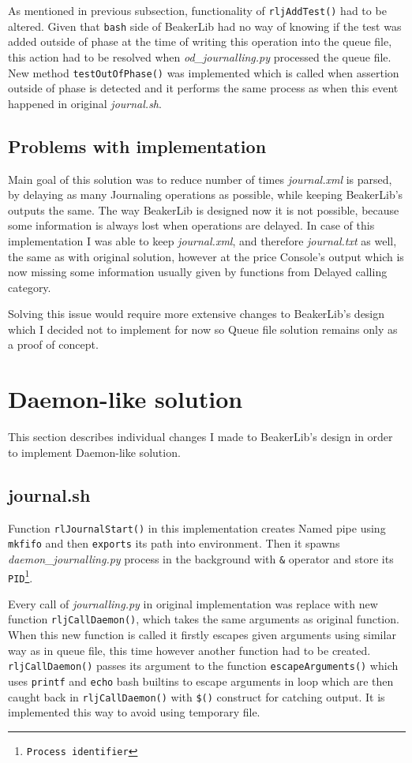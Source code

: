 As mentioned in previous subsection, functionality of  \texttt{rljAddTest()} had to be altered. Given that \texttt{bash} side of BeakerLib had no way of knowing if the test was added outside of phase at the time of writing this operation into the queue file, this action had to be resolved when \textit{od\_journalling.py} processed the queue file. 
New method \texttt{testOutOfPhase()} was implemented which is called when assertion outside of phase is detected and it performs the same process as when this event happened in original \textit{journal.sh}.

\subsection{Problems with implementation}
Main goal of this solution was to reduce number of times \textit{journal.xml} is parsed, by delaying as many Journaling operations as possible, while keeping BeakerLib's outputs the same. The way BeakerLib is designed now it is not possible, because some information is always lost when operations are delayed. In case of this implementation I was able to keep \textit{journal.xml}, and therefore \textit{journal.txt}  as well, the same as with original solution, however at the price Console's output which is now missing some information usually given by functions from Delayed calling category.

Solving this issue would require more extensive changes to BeakerLib's design which I decided not to implement for now so Queue file solution remains only as a proof of concept.

\section{Daemon-like solution}
This section describes individual changes I made to BeakerLib's design in order to implement Daemon-like solution.

\subsection{journal.sh}
Function \texttt{rlJournalStart()} in this implementation creates Named pipe using \texttt{mkfifo} and then \texttt{exports} its path into environment.
Then it spawns \textit{daemon\_journalling.py} process in the background with \texttt{\&} operator and store its \texttt{PID\footnote{Process identifier}}.

Every call of \textit{journalling.py} in original implementation was replace with new function \texttt{rljCallDaemon()}, which takes the same arguments as original function. When this new function is called it firstly escapes given arguments using similar way as in queue file, this time however another function had to be created.  \texttt{rljCallDaemon()} passes its argument to the function \texttt{escapeArguments()} which uses \texttt{printf} and \texttt{echo} bash builtins to escape arguments in loop which are then caught back in \texttt{rljCallDaemon()} with \texttt{\$()} construct\cite{command_substitution} for catching output. It is implemented this way to avoid using temporary file.

